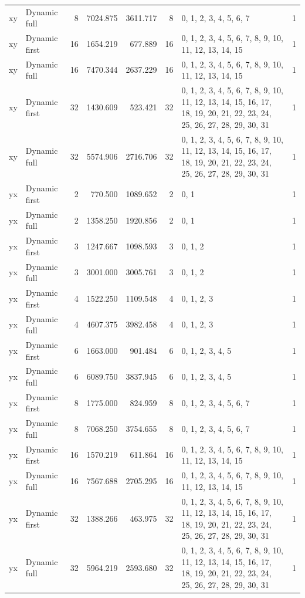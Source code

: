 \documentclass[10pt,a4paper]{article}
\begin{document}
\begin{longtable}{@{}p{23mm}p{29mm}rrrrp{36mm}r@{}}
xy & Dynamic full & 8 & 7024.875 & 3611.717 & 8 & 0, 1, 2, 3, 4, 5, 6, 7 & 1 \\
xy & Dynamic first & 16 & 1654.219 & 677.889 & 16 & 0, 1, 2, 3, 4, 5, 6, 7, 8, 9, 10, 11, 12, 13, 14, 15 & 1 \\
xy & Dynamic full & 16 & 7470.344 & 2637.229 & 16 & 0, 1, 2, 3, 4, 5, 6, 7, 8, 9, 10, 11, 12, 13, 14, 15 & 1 \\
xy & Dynamic first & 32 & 1430.609 & 523.421 & 32 & 0, 1, 2, 3, 4, 5, 6, 7, 8, 9, 10, 11, 12, 13, 14, 15, 16, 17, 18, 19, 20, 21, 22, 23, 24, 25, 26, 27, 28, 29, 30, 31 & 1 \\
xy & Dynamic full & 32 & 5574.906 & 2716.706 & 32 & 0, 1, 2, 3, 4, 5, 6, 7, 8, 9, 10, 11, 12, 13, 14, 15, 16, 17, 18, 19, 20, 21, 22, 23, 24, 25, 26, 27, 28, 29, 30, 31 & 1 \\
yx & Dynamic first & 2 & 770.500 & 1089.652 & 2 & 0, 1 & 1 \\
yx & Dynamic full & 2 & 1358.250 & 1920.856 & 2 & 0, 1 & 1 \\
yx & Dynamic first & 3 & 1247.667 & 1098.593 & 3 & 0, 1, 2 & 1 \\
yx & Dynamic full & 3 & 3001.000 & 3005.761 & 3 & 0, 1, 2 & 1 \\
yx & Dynamic first & 4 & 1522.250 & 1109.548 & 4 & 0, 1, 2, 3 & 1 \\
yx & Dynamic full & 4 & 4607.375 & 3982.458 & 4 & 0, 1, 2, 3 & 1 \\
yx & Dynamic first & 6 & 1663.000 & 901.484 & 6 & 0, 1, 2, 3, 4, 5 & 1 \\
yx & Dynamic full & 6 & 6089.750 & 3837.945 & 6 & 0, 1, 2, 3, 4, 5 & 1 \\
yx & Dynamic first & 8 & 1775.000 & 824.959 & 8 & 0, 1, 2, 3, 4, 5, 6, 7 & 1 \\
yx & Dynamic full & 8 & 7068.250 & 3754.655 & 8 & 0, 1, 2, 3, 4, 5, 6, 7 & 1 \\
yx & Dynamic first & 16 & 1570.219 & 611.864 & 16 & 0, 1, 2, 3, 4, 5, 6, 7, 8, 9, 10, 11, 12, 13, 14, 15 & 1 \\
yx & Dynamic full & 16 & 7567.688 & 2705.295 & 16 & 0, 1, 2, 3, 4, 5, 6, 7, 8, 9, 10, 11, 12, 13, 14, 15 & 1 \\
yx & Dynamic first & 32 & 1388.266 & 463.975 & 32 & 0, 1, 2, 3, 4, 5, 6, 7, 8, 9, 10, 11, 12, 13, 14, 15, 16, 17, 18, 19, 20, 21, 22, 23, 24, 25, 26, 27, 28, 29, 30, 31 & 1 \\
yx & Dynamic full & 32 & 5964.219 & 2593.680 & 32 & 0, 1, 2, 3, 4, 5, 6, 7, 8, 9, 10, 11, 12, 13, 14, 15, 16, 17, 18, 19, 20, 21, 22, 23, 24, 25, 26, 27, 28, 29, 30, 31 & 1 \\
\end{longtable}\normalsize\setlength{\tabcolsep}{6pt}
\clearpage
\end{document}
